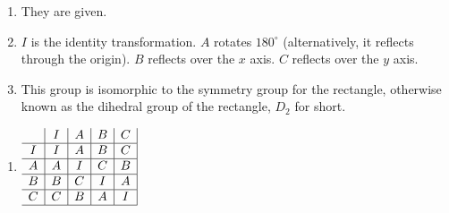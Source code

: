 \documentclass[../gatm.tex]{subfiles}
\begin{document}

\begin{minipage}{0.6\textwidth}
\begin{enumerate}[label=(\alph*)]
\item They are given.
\item $I$ is the identity transformation. $A$ rotates $180^\circ$ (alternatively, it reflects through the origin). $B$ reflects over the $x$ axis. $C$ reflects over the $y$ axis.
\item This group is isomorphic to the symmetry group for the rectangle, otherwise known as the dihedral group of the rectangle, $D_2$ for short.
\setcounter{mg_enumi}{\value{enumi}}
\end{enumerate}
\end{minipage}\hfill
\begin{minipage}{0.25\textwidth}
\begin{enumerate}[label=(\alph*)]
\setcounter{enumi}{\value{mg_enumi}}
\item $\begin{array}{c|c|c|c|c|}
& I & A & B & C \\ \hline
I & I & A & B & C \\ \hline
A & A & I & C & B \\ \hline
B & B & C & I & A \\ \hline 
C & C & B & A & I \\ \hline
\end{array}$
\end{enumerate}
\end{minipage}
\vspace{2cm}
\end{document}
